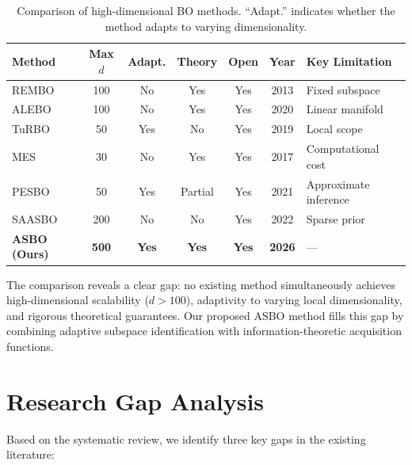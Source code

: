 \begin{table}[htbp]
    \centering
    \caption{Comparison of high-dimensional BO methods.  ``Adapt.'' indicates
    whether the method adapts to varying dimensionality.}
    \label{tab:method-comparison}
    \begin{tabularx}{\textwidth}{@{}lcccccX@{}}
        \toprule
        \textbf{Method} & \textbf{Max $d$} & \textbf{Adapt.} &
        \textbf{Theory} & \textbf{Open} & \textbf{Year} &
        \textbf{Key Limitation} \\
        \midrule
        REMBO      & 100  & No  & Yes & Yes & 2013 & Fixed subspace \\
        ALEBO      & 100  & No  & Yes & Yes & 2020 & Linear manifold \\
        TuRBO      & 50   & Yes & No  & Yes & 2019 & Local scope \\
        MES        & 30   & No  & Yes & Yes & 2017 & Computational cost \\
        PESBO      & 50   & Yes & Partial & Yes & 2021 & Approximate inference \\
        SAASBO     & 200  & No  & No  & Yes & 2022 & Sparse prior \\
        \textbf{ASBO (Ours)} & \textbf{500} & \textbf{Yes} &
        \textbf{Yes} & \textbf{Yes} & \textbf{2026} & --- \\
        \bottomrule
    \end{tabularx}
\end{table}

The comparison reveals a clear gap: no existing method simultaneously achieves
high-dimensional scalability ($d > 100$), adaptivity to varying local
dimensionality, and rigorous theoretical guarantees.  Our proposed ASBO method
fills this gap by combining adaptive subspace identification with
information-theoretic acquisition functions.

\section{Research Gap Analysis}
\label{sec:research-gap}

Based on the systematic review, we identify three key gaps in the existing
literature:

